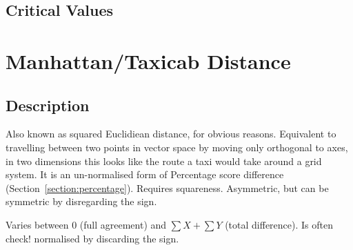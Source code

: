 \documentclass[11pt]{article}
\begin{document}
\subsection{Critical Values}













\section{Manhattan/Taxicab Distance}
\label{section:manhattan}
\subsection{Description}
Also known as squared Euclidiean distance, for obvious reasons.  
Equivalent to travelling between two points in vector space by moving only orthogonal to axes, in two dimensions this looks like the route a taxi would take around a grid system.  
It is an un-normalised form of Percentage score difference (Section~\ref{section:percentage}).  
Requires squareness.  
Asymmetric, but can be symmetric by disregarding the sign.
 
Varies between 0 (full agreement) and $\sum{X} + \sum{Y}$ (total difference). Is often {\color{red}  check!} normalised by discarding the sign.
\end{document}
